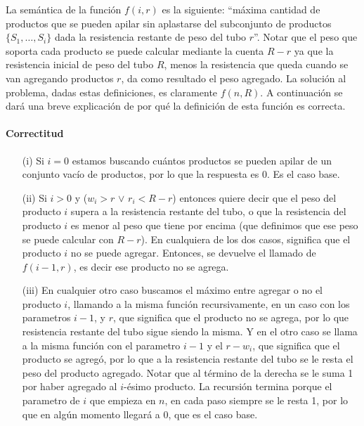 \documentclass[10pt,a4paper]{article}
\begin{document}
La semántica de la función $f(i, r)$ es la siguiente: ``máxima cantidad de productos que se pueden apilar sin aplastarse del subconjunto de productos $\{S_1, \hdots, S_i\}$ dada la resistencia restante de peso del tubo $r$''. Notar que el peso que soporta cada producto se puede calcular mediante la cuenta $R-r$ ya que la resistencia inicial de peso del tubo $R$, menos la resistencia que queda cuando se van agregando productos $r$, da como resultado el peso agregado. La solución al problema, dadas estas definiciones, es claramente $f(n, R)$. A continuación se dará una breve explicación de por qué la definición de esta función es correcta.

\paragraph{Correctitud}
\begin{enumerate}
    \item[(i)] {Si $i = 0$ estamos buscando cuántos productos se pueden apilar de un conjunto vacío de productos, por lo que la respuesta es 0. Es el caso base.}
    \item[(ii)] {Si $i > 0$ y ($w_i > r$ $\lor$ $r_i < R - r$) entonces quiere decir que el peso del producto $i$ supera a la resistencia restante del tubo, o que la resistencia del producto $i$ es menor al peso que tiene por encima (que definimos que ese peso se puede calcular con $R - r$). En cualquiera de los dos casos, significa que el producto $i$ no se puede agregar. Entonces, se devuelve el llamado de $f(i-1,r)$, es decir ese producto no se agrega.}
    \item[(iii)] { En cualquier otro caso buscamos el máximo entre agregar o no el producto $i$, llamando a la misma función recursivamente, en un caso con los parametros $i - 1$, y $r$, que significa que el producto no se agrega, por lo que resistencia restante del tubo sigue siendo la misma. Y en el otro caso se llama a la misma función con el parametro $i - 1$ y el $r - w_i$, que significa que el producto se agregó, por lo que a la resistencia restante del tubo se le resta el peso del producto agregado. Notar que al término de la derecha se le suma 1 por haber agregado al $i$-ésimo producto. La recursión termina porque el parametro de $i$ que empieza en $n$, en cada paso siempre se le resta 1, por lo que en algún momento llegará a 0, que es el caso base}.
\end{enumerate}
\end{document}
